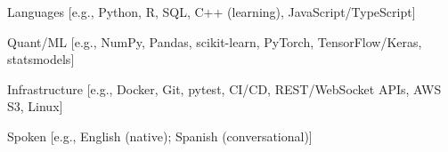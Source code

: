 

\begin{cvskills}

  \cvskill
    {Languages} %
    {[e.g., Python, R, SQL, C++ (learning), JavaScript/TypeScript]} %

  \cvskill
    {Quant/ML} %
    {[e.g., NumPy, Pandas, scikit-learn, PyTorch, TensorFlow/Keras, statsmodels]} %

  \cvskill
    {Infrastructure} %
    {[e.g., Docker, Git, pytest, CI/CD, REST/WebSocket APIs, AWS S3, Linux]} %

  \cvskill
    {Spoken} %
    {[e.g., English (native); Spanish (conversational)]} %

\end{cvskills}

